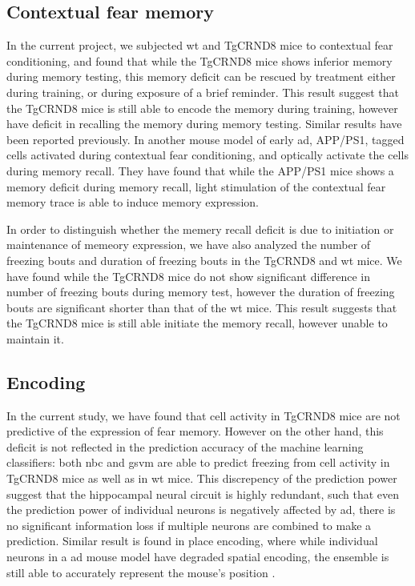 \subsection{Contextual fear memory}

In the current project, we subjected \gls{wt} and TgCRND8 mice to contextual fear conditioning, and found that while the TgCRND8 mice shows inferior memory during memory testing, this memory deficit can be rescued by \tglu treatment either during training, or during exposure of a brief reminder. This result suggest that the TgCRND8 mice is still able to encode the memory during training, however have deficit in recalling the memory during memory testing. Similar results have been reported previously. In another mouse model of early \gls{ad}, APP/PS1, \citet{roy16} tagged cells activated during contextual fear conditioning, and optically activate the cells during memory recall. They have found that while the APP/PS1 mice shows a memory deficit during memory recall, light stimulation of the contextual fear memory trace is able to induce memory expression. 

In order to distinguish whether the memery recall deficit is due to initiation or maintenance of memeory expression, we have also analyzed the number of freezing bouts and duration of freezing bouts in the TgCRND8 and \gls{wt} mice. We have found while the TgCRND8 mice do not show significant difference in number of freezing bouts during memory test, however the duration of freezing bouts are significant shorter than that of the \gls{wt} mice. This result suggests that the TgCRND8 mice is still able initiate the memory recall, however unable to maintain it. 

\subsection{Encoding}

In the current study, we have found that cell activity in TgCRND8 mice are not predictive of the expression of fear memory. However on the other hand, this deficit is not reflected in the prediction accuracy of the machine learning classifiers: both \gls{nbc} and \gls{gsvm} are able to predict freezing from cell activity in TgCRND8 mice as well as in \gls{wt} mice. This discrepency of the prediction power suggest that the hippocampal neural circuit is highly redundant, such that even the prediction power of individual neurons is negatively affected by \gls{ad}, there is no significant information loss if multiple neurons are combined to make a prediction. Similar result is found in place encoding, where while individual neurons in a \gls{ad} mouse model have degraded spatial encoding, the ensemble is still able to accurately represent the mouse's position \citep{cheng13}.  

